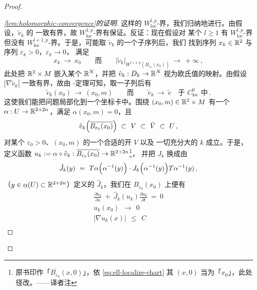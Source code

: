 \begin{proof}
\begin{proof}[\cref*{lem:holomorphic-convergence}的证明]
这样的 $W^{l,p}_{\mathrm{loc}}$-界，我们归纳地进行。由假设，$\tilde{v}_{k}$ 的%
\trGradient{}一致有界，故 $W^{1,p}_{\mathrm{loc}}$-界有保证。反证：现在假设对%
某个 $l\geq1$ 有 $W^{l,p}_{\mathrm{loc}}$-界但没有%
$W^{l+1,p}_{\mathrm{loc}}$-界。于是，可能取 $\tilde{v}_{k}$ 的一个子序列后，我们%
找到序列 $x_{k}\in\mathbb{R}^{2}$ 与序列 $\varepsilon_{k}>0$，$\varepsilon_{k}\to0$，%
满足
\begin{equation}\label{eq:ell-blowup-sequence}
x_{k}\ \to\ x_{0}\qquad\text{而}\qquad \bigl|\tilde{v}_{k}\bigr|_{W^{l+1,p}\left(B_{\varepsilon_{k}}(x_{k})\right)}\ \to\ +\infty\,,
\end{equation}
此处把 $\mathbb{R}^{2}\times M$ 嵌入某个 $\mathbb{R}^{N}$，并把 $\tilde{v}_{k}:D_{k}\to\mathbb{R}^{N}$%
视为欧氏值的映射。由假设 $|\nabla\tilde{v}_{k}|$ 一致有界，故由%
\trArzela-\trAscoli{}定理可知，取一子列后有
\begin{equation}\label{eq:ell-conv-c0loc}
\tilde{v}_{k}(x_{0})\ \to\ (x_{0},m)\qquad\text{而}\qquad \tilde{v}_{k}\ \to\ \tilde{v}\quad\text{于 }C^{0}_{\mathrm{loc}}\text{ 中}\,.
\end{equation}
这使我们能把问题局部化到一个坐标卡中。围绕 $(x_{0},m)\in\mathbb{R}^{2}\times M$ 有一个%
\trChart{} $\alpha:U\to\mathbb{R}^{2+2n}$，满足 $\alpha(x_{0},m)=0$，且
\begin{equation}\label{eq:ell-localize-chart}
\tilde{v}_{k}\Bigl(\overline{B_{\varepsilon_{0}}(x_{0})}\Bigr)\ \subset\ V\ \subset\ \bar{V}\ \subset\ U\,,
\end{equation}
对某个 $\varepsilon_{0}>0$、$(x_{0},m)$ 的一个合适的开\trNeighborhood{} $V$ 以及%
一切充分大的 $k$ 成立。于是，定义\trSmooth{}函数%
$u_{k}:=\alpha\circ\tilde{v}_{k}:\overline{B_{\varepsilon_{0}}(x_{0})}\to\mathbb{R}^{2+2n}$\footnote{原书印作「$\overline{B_{\varepsilon_{0}}}(x,0)$」，依 \eqref{eq:ell-localize-chart} 其 $(x,0)$ 当为「$x_{0}$」，此处径改。——译者注}，%
并把 $J_{k}$ 换成由
\begin{equation}\label{eq:ell-jhat-k}
\hat{J}_{k}(y)\ =\ T\alpha\Bigl(\alpha^{-1}(y)\Bigr)\cdot J_{k}\Bigl(\alpha^{-1}(y)\Bigr)T\alpha^{-1}(y)\,,
\end{equation}
（$y\in\alpha(U)\subset\mathbb{R}^{2+2n}$）定义的 $\hat{J}_{k}$，我们在%
$B_{\varepsilon_{0}}(x_{0})$ 上便有
\begin{equation}\label{eq:ell-uk-props}
\begin{gathered}
\frac{\partial u_{k}}{\partial s}\ +\ \hat{J}_{k}(u_{k})\frac{\partial u_{k}}{\partial t}\ =\ 0\\
u_{k}(x_{0})\ \ \to\ \ 0\\
\bigl|\nabla u_{k}(x)\bigr|\ \ \leq\ \ C\\

\end{gathered}
\end{equation}
\end{proof}
\end{proof}
